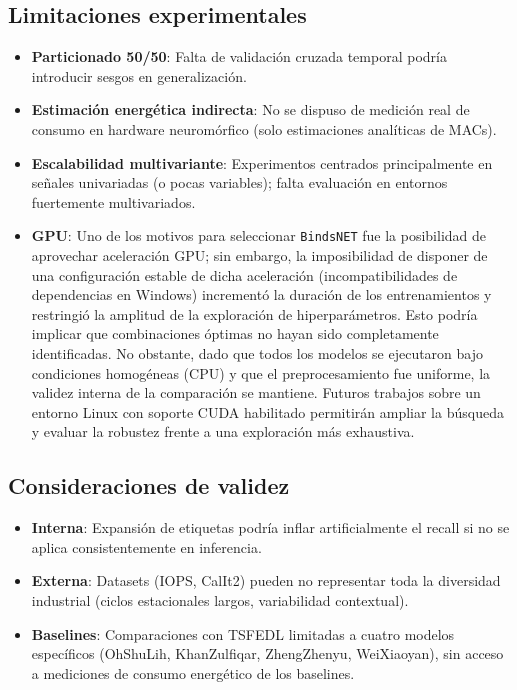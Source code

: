 \subsection{Limitaciones experimentales}
\begin{itemize}
    \item \textbf{Particionado 50/50}: Falta de validación cruzada temporal podría introducir sesgos en generalización.
    \item \textbf{Estimación energética indirecta}: No se dispuso de medición real de consumo en hardware neuromórfico (solo estimaciones analíticas de MACs).
    \item \textbf{Escalabilidad multivariante}: Experimentos centrados principalmente en señales univariadas (o pocas variables); falta evaluación en entornos fuertemente multivariados.
    \item \textbf{GPU}: Uno de los motivos para seleccionar \texttt{BindsNET} fue la posibilidad de aprovechar aceleración GPU; sin embargo, la imposibilidad de disponer de una configuración estable de dicha aceleración (incompatibilidades de dependencias en Windows) incrementó la duración de los entrenamientos y restringió la amplitud de la exploración de hiperparámetros. Esto podría implicar que combinaciones óptimas no hayan sido completamente identificadas. No obstante, dado que todos los modelos se ejecutaron bajo condiciones homogéneas (CPU) y que el preprocesamiento fue uniforme, la validez interna de la comparación se mantiene. Futuros trabajos sobre un entorno Linux con soporte CUDA habilitado permitirán ampliar la búsqueda y evaluar la robustez frente a una exploración más exhaustiva.
\end{itemize}

\subsection{Consideraciones de validez}
\begin{itemize}
    \item \textbf{Interna}: Expansión de etiquetas podría inflar artificialmente el recall si no se aplica consistentemente en inferencia.
    \item \textbf{Externa}: Datasets (IOPS, CalIt2) pueden no representar toda la diversidad industrial (ciclos estacionales largos, variabilidad contextual).
    \item \textbf{Baselines}: Comparaciones con TSFEDL limitadas a cuatro modelos específicos (OhShuLih, KhanZulfiqar, ZhengZhenyu, WeiXiaoyan), sin acceso a mediciones de consumo energético de los baselines.
\end{itemize}

